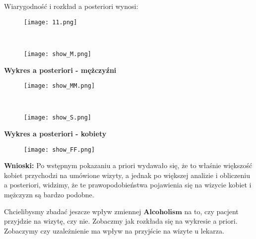 \documentclass[12pt]{article}
\begin{document}
\newpage
Wiarygodność i rozkład a posteriori wynosi:
\begin{flushright}
\begin{figure}[ht!]
\texttt{[image: 11.png]}
\label{fig:2}
\end{figure}
\end{flushright}
\\
\begin{flushright}
\begin{figure}[ht!]
\texttt{[image: show\_M.png]}
\label{fig:2}
\end{figure}
\end{flushright}
\begin{center}
\textbf{Wykres a posteriori - mężczyźni}    
\end{center}
\begin{figure}[ht!]
\begin{center}
\texttt{[image: show\_MM.png]}
\label{fig:2}
\end{center}
\end{figure}
\newpage

\\
\begin{flushright}
\begin{figure}[ht!]
\texttt{[image: show\_S.png]}
\label{fig:2}
\end{figure}
\end{flushright}
\begin{center}
\textbf{Wykres a posteriori - kobiety}    
\end{center}
\begin{figure}[ht!]
\begin{center}
\texttt{[image: show\_FF.png]}
\label{fig:2}
\end{center}
\end{figure}
\textbf{Wnioski:} Po wstępnym pokazaniu a priori wydawało się, że to właśnie większość kobiet przychodzi na umówione wizyty, a  jednak po większej analizie i obliczeniu a posteriori, widzimy, że te prawopodobieństwa pojawienia się na wizycie kobiet i mężczyzn są bardzo podobne.


\newpage
Chcielibysmy zbadać jeszcze wpływ zmiennej $\textbf{Alcoholism}$ na to, czy pacjent przyjdzie na wizytę, czy nie. Zobaczmy jak rozkłada się na wykresie a priori. Zobaczymy czy uzależnienie ma wpływ na przyjście na wizyte u lekarza.\\
\end{document}
